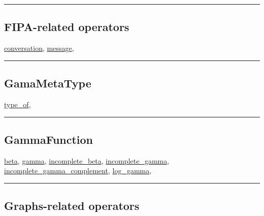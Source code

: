 \documentclass[]{book}
\theoremstyle{definition}
\theoremstyle{definition}
\theoremstyle{definition}
\theoremstyle{remark}
\begin{document}
\begin{center}\rule{0.5\linewidth}{\linethickness}\end{center}

\subsection{FIPA-related operators}\label{fipa-related-operators}

\href{operators-b-to-c.html\#conversation}{conversation},
\href{operators-i-to-m.html\#message}{message},

\begin{center}\rule{0.5\linewidth}{\linethickness}\end{center}

\subsection{GamaMetaType}\label{gamametatype}

\href{operators-s-to-z.html\#type_of}{type\_of},

\begin{center}\rule{0.5\linewidth}{\linethickness}\end{center}

\subsection{GammaFunction}\label{gammafunction}

\href{operators-b-to-c.html\#beta}{beta},
\href{operators-d-to-h.html\#gamma}{gamma},
\href{operators-i-to-m.html\#incomplete_beta}{incomplete\_beta},
\href{operators-i-to-m.html\#incomplete_gamma}{incomplete\_gamma},
\href{operators-i-to-m.html\#incomplete_gamma_complement}{incomplete\_gamma\_complement},
\href{operators-i-to-m.html\#log_gamma}{log\_gamma},

\begin{center}\rule{0.5\linewidth}{\linethickness}\end{center}

\subsection{Graphs-related operators}\label{graphs-related-operators}
\end{document}
